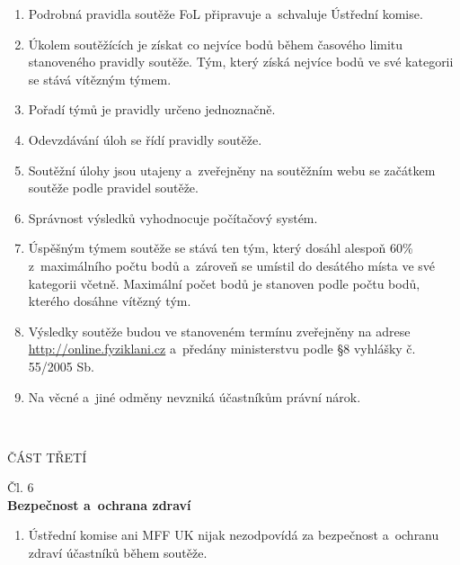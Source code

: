 \documentclass[a4paper,11pt,oneside]{article}
\begin{document}
\begin{enumerate}[(1)]
\item Podrobná pravidla soutěže FoL připravuje a~schvaluje Ústřední komise.

\item Úkolem soutěžících je získat co nejvíce bodů během časového limitu stanoveného pravidly soutěže. Tým, který získá nejvíce bodů ve své kategorii se stává vítězným týmem.

\item Pořadí týmů je pravidly určeno jednoznačně.

\item Odevzdávání úloh se řídí pravidly soutěže.

\item Soutěžní úlohy jsou utajeny a~zveřejněny na soutěžním webu se začátkem soutěže podle pravidel soutěže.

\item Správnost výsledků vyhodnocuje počítačový systém.

\item Úspěšným týmem soutěže se stává ten tým, který dosáhl alespoň 60\% z~maximálního počtu bodů a~zároveň se umístil do desátého místa ve své kategorii včetně. Maximální počet bodů je stanoven podle počtu bodů, kterého dosáhne vítězný
tým.

\item Výsledky soutěže budou ve stanoveném termínu zveřejněny na adrese \\ \url{http://online.fyziklani.cz} a~předány ministerstvu podle \S{}8 vyhlášky č. 55/2005 Sb. 

\item Na věcné a~jiné odměny nevzniká účastníkům právní nárok. 

\end{enumerate}
\hfill \\

\pagebreak
\begin{center}
{\Large{ČÁST TŘETÍ}}\\
\end{center}
%
\begin{center}
{\Large{Čl. 6}}\\
\large{\bf{Bezpečnost a~ochrana zdraví}}
\end{center}

\begin{enumerate}[(1)]
\item Ústřední komise ani MFF UK nijak nezodpovídá za bezpečnost a~ochranu zdraví účastníků během soutěže.
\end{enumerate}
\end{document}
